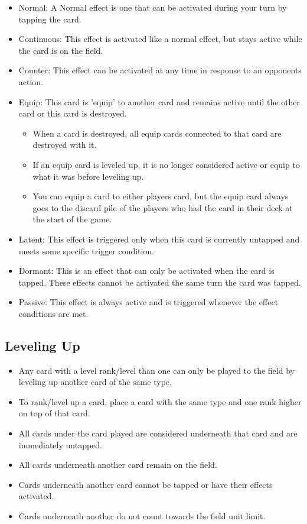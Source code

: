\begin{itemize}
    \begin{itemize}
        \item Normal: A Normal effect is one that can be activated during your turn by tapping the card.
        \item Continuous: This effect is activated like a normal effect, but stays active while the card is on the field.
		\item Counter: This effect can be activated at any time in response to an opponents action.
		\item Equip: This card is 'equip' to another card and remains active until the other card or this card is destroyed. 
		\begin{itemize}
			\item When a card is destroyed, all equip cards connected to that card are destroyed with it.
			\item If an equip card is leveled up, it is no longer considered active or equip to what it was before leveling up.
			\item You can equip a card to either players card, but the equip card always goes to the discard pile of the players who had the card in their deck at the start of the game.
		\end{itemize}
		\item Latent: This effect is triggered only when this card is currently untapped and meets some specific trigger condition. 
		\item Dormant: This is an effect that can only be activated when the card is tapped. These effects cannot be activated the same turn the card was tapped.
  		\item Passive: This effect is always active and is triggered whenever the effect conditions are met.
    \end{itemize}
\end{itemize}








\subsection{Leveling Up}
\begin{itemize}
    \item Any card with a level rank/level than one can only be played to the field by leveling up another card of the same type.
    \item To rank/level up a card, place a card with the same type and one rank higher on top of that card.
    \item All cards under the card played are considered underneath that card and are immediately untapped.
    \item All cards underneath another card remain on the field.
    \item Cards underneath another card cannot be tapped or have their effects activated.
    \item Cards underneath another do not count towards the field unit limit.
\end{itemize}








